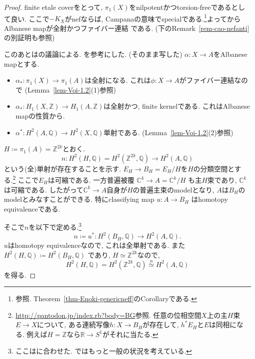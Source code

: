 \documentclass[dvipdfmx,a4paper,11pt]{article} %
\theoremstyle{definition}
\theoremstyle{remark}
\numberwithin{equation}{section}
\newcommand{\R}{\mathbb{R}}
\newcommand{\Z}{\mathbb{Z}}
\newcommand{\C}{\mathbb{C}}
\newcommand{\Q}{\mathbb{Q}}
\begin{document}
\begin{proof}
finite etale coverをとって, $\pi_1(X)$をnilpotentかつtorsion-freeであるとして良い. 
ここで$-K_X$がnefならば, Campanaの意味でspecialである.\footnote{\cite[Remark 2.22]{Iwa-Cam}参照. Theorem~\ref{thm-Enoki-genericneff}のCorollaryである.}よって\cite[Subsection 5.2]{Iwa-Cam}からAlbanese mapが全射かつファイバー連結
である. (下のRemark~\ref{rem-cao-nefanti}の別証明も参照)

このあとは\cite{Cam95a}の議論による. \cite[Theorem 3.23]{Voi}を参考にした. 
(\cite[Subsection 7.2]{Iwa-Cam}そのまま写した)
$\alpha \colon X \to A$をAlbanese mapとする. 
 \begin{itemize}
 \item \(\alpha_* \colon \pi_1(X) \to \pi_1(A)\)は全射になる. これは\( \phi \colon X \to A\)がファイバー連結なので (Lemma~\ref{lem-Voi-1.2}(1)参照)
\item  \( \alpha_* \colon H_1(X, \mathbb{Z}) \to H_1(A, \mathbb{Z}) \)は全射かつ, finite kernelである. これはAlbanese mapの性質から.
\item \( \alpha^* \colon H^2(A, \mathbb{Q}) \to H^2(X, \mathbb{Q}) \)単射である. (Lemma~\ref{lem-Voi-1.2}(2)参照)
\end{itemize}

\( H \coloneqq  \pi_1(A) =\Z^{2k}\)とおく.
\[
n\colon H^2(H, \mathbb{Q}) =H^2(\Z^{2k}, \Q)\to H^2(A, \mathbb{Q})
\]
という(全)単射が存在することを示す. 
\(E_H \to B_H = E_H / H\)を$H$の分類空間とする.\footnote{\url{http://pantodon.jp/index.rb?body=BG}参照. 任意の位相空間$X$上の主$H$束$E \to X$について, ある連続写像$h \colon X \to B_H$が存在して, $h^{*}E_H$と$E$は同相になる. 例えば$H=\Z$なら$\R\to S^1$がそれに当たる. } 
ここで\(E_H\)は可縮である. 
一方普遍被覆
\(
\C^k\to A=\C^k/H
\)
も主$H$束であり, $\C^k$は可縮である. 
したがって$\C^k\to A$自身が$H$の普遍主束のmodelとなり, 
$A$は$B_H$のmodelとみなすことができる. 
特にclassifying map
\(
u\colon A\to B_H
\)
はhomotopy equivalenceである. 

そこで$n$を以下で定める.\footnote{ここは\cite[Theorem 3.23]{Voi}に合わせた. \cite[Theorem 3.23]{Voi}ではもっと一般の状況を考えている.}
\[
n\coloneqq u^{*} \colon H^2(B_H, \mathbb{Q}) \to H^2(A, \mathbb{Q}).
\]
$u$はhomotopy equivalenceなので,
これは全単射である. 
また
\(
H^2(H,\Q)\coloneqq H^2(B_H,\Q)
\)
であり, $H\simeq\Z^{2k}$なので,
\[
H^2(H,\Q)
=
H^2(\Z^{2k},\Q)
\overset{n}{\simeq}
H^2(A,\Q)
\]
を得る.

\end{proof}
\end{document}
